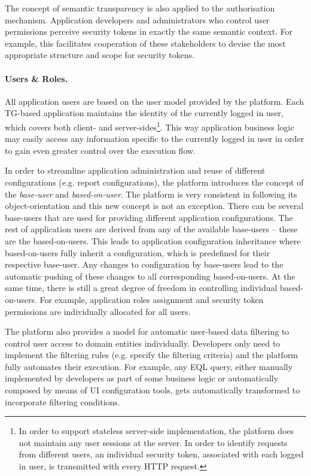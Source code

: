   The concept of semantic transparency is also applied to the authorisation mechanism.
  Application developers and administrators who control user permissions perceive security tokens in exactly the same semantic context.
  For example, this facilitates cooperation of these stakeholders to devise the most appropriate structure and scope for security tokens.

  \paragraph{Users \& Roles.} 
  All application users are based on the user model provided by the platform.
  Each TG-based application maintains the identity of the currently logged in user, which covers both client- and server-sides\footnote{
    In order to support stateless server-side implementation, the platform does not maintain any user sessions at the server. 
    In order to identify requests from different users, an individual security token, associated with each logged in user, is transmitted with every HTTP request.}.
  This way application business logic may easily access any information specific to the currently logged in user in order to gain even greater control over the  execution flow.
  
  In order to streamline application administration and reuse of different configurations (e.g. report configurations), the platform introduces the concept of the \emph{base-user} and \emph{based-on-user}.
  The platform is very consistent in following its object-orientation and this new concept is not an exception.
  There can be several base-users that are used for providing different application configurations.
  The rest of application users are derived from any of the available base-users -- these are the based-on-users.
  This leads to application configuration inheritance where based-on-users fully inherit a configuration, which is predefined for their respective base-user.
  Any changes to configuration by base-users lead to the automatic pushing of these changes to all corresponding based-on-users.
  At the same time, there is still a great degree of freedom in controlling individual based-on-users.
  For example, application roles assignment and security token permissions are individually allocated for all users.
  
  The platform also provides a model for automatic user-based data filtering to control user access to domain entities individually.
  Developers only need to implement the filtering rules (e.g. specify the filtering criteria) and the platform fully automates their execution.
  For example, any EQL query, either manually implemented by developers as part of some business logic or automatically composed by means of UI configuration tools, gets automatically transformed to incorporate filtering conditions.

